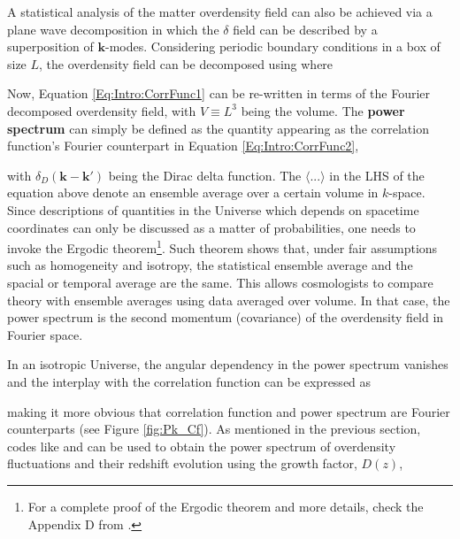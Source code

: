 
\qquad A statistical analysis of the matter overdensity field can also be achieved via a plane wave decomposition in which the $\delta$ field can be described by a superposition of $\textbf{k}$-modes. Considering periodic boundary conditions in a box of size $L$, the overdensity field can be decomposed using
where

\qquad Now, Equation \eqref{Eq:Intro:CorrFunc1} can be re-written in terms of the Fourier decomposed overdensity field,
with $V \equiv L^3$ being the volume. The \textbf{power spectrum} can simply be defined as the quantity appearing as the correlation function's Fourier counterpart in Equation \eqref{Eq:Intro:CorrFunc2},

with $\delta_D(\textbf{k} - \textbf{k}')$ being the Dirac delta function. The $\langle ... \rangle$ in the LHS of the equation above denote an ensemble average over a certain volume in $k$-space. Since descriptions of quantities in the Universe which depends on spacetime coordinates can only be discussed as a matter of probabilities, one needs to invoke the Ergodic theorem\footnote{For a complete proof of the Ergodic theorem and more details, check the Appendix D from \cite{weinberg2008cosmology}.}. Such theorem shows that, under fair assumptions such as homogeneity and isotropy, the statistical ensemble average and the spacial or temporal average are the same. This allows cosmologists to compare theory with ensemble averages using data averaged over volume. In that case, the power spectrum is the second momentum (covariance) of the overdensity field in Fourier space. 

\qquad In an isotropic Universe, the angular dependency in the power spectrum vanishes and the interplay with the correlation function can be expressed as

making it more obvious that correlation function and power spectrum are Fourier counterparts (see Figure \ref{fig:Pk_Cf}). %
As mentioned in the previous section, codes like \camb and \class can be used to obtain the power spectrum of overdensity fluctuations and their redshift evolution using the growth factor, $D(z)$,

